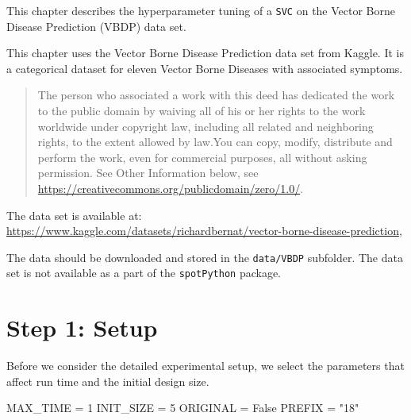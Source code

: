\documentclass[
  letterpaper,
  DIV=11,
  numbers=noendperiod]{scrreprt}
\newenvironment{Shaded}{\begin{snugshade}}{\end{snugshade}}
\newcommand{\DecValTok}[1]{\textcolor[rgb]{0.68,0.00,0.00}{#1}}
\newcommand{\NormalTok}[1]{\textcolor[rgb]{0.00,0.23,0.31}{#1}}
\newcommand{\OperatorTok}[1]{\textcolor[rgb]{0.37,0.37,0.37}{#1}}
\newcommand{\StringTok}[1]{\textcolor[rgb]{0.13,0.47,0.30}{#1}}
\newcommand{\VariableTok}[1]{\textcolor[rgb]{0.07,0.07,0.07}{#1}}
\begin{document}
This chapter describes the hyperparameter tuning of a \texttt{SVC} on
the Vector Borne Disease Prediction (VBDP) data set.

\begin{tcolorbox}[enhanced jigsaw, left=2mm, title=\textcolor{quarto-callout-important-color}{\faExclamation}\hspace{0.5em}{Vector Borne Disease Prediction Data Set}, titlerule=0mm, toprule=.15mm, leftrule=.75mm, colbacktitle=quarto-callout-important-color!10!white, colback=white, arc=.35mm, toptitle=1mm, bottomtitle=1mm, colframe=quarto-callout-important-color-frame, bottomrule=.15mm, rightrule=.15mm, breakable, coltitle=black, opacitybacktitle=0.6, opacityback=0]

This chapter uses the Vector Borne Disease Prediction data set from
Kaggle. It is a categorical dataset for eleven Vector Borne Diseases
with associated symptoms.

\begin{quote}
The person who associated a work with this deed has dedicated the work
to the public domain by waiving all of his or her rights to the work
worldwide under copyright law, including all related and neighboring
rights, to the extent allowed by law.You can copy, modify, distribute
and perform the work, even for commercial purposes, all without asking
permission. See Other Information below, see
\url{https://creativecommons.org/publicdomain/zero/1.0/}.
\end{quote}

The data set is available at:
\url{https://www.kaggle.com/datasets/richardbernat/vector-borne-disease-prediction},

The data should be downloaded and stored in the \texttt{data/VBDP}
subfolder. The data set is not available as a part of the
\texttt{spotPython} package.

\end{tcolorbox}

\hypertarget{sec-setup-18}{%
\section{Step 1: Setup}\label{sec-setup-18}}

Before we consider the detailed experimental setup, we select the
parameters that affect run time and the initial design size.

\begin{Shaded}
\begin{Highlighting}[]
\NormalTok{MAX\_TIME }\OperatorTok{=} \DecValTok{1}
\NormalTok{INIT\_SIZE }\OperatorTok{=} \DecValTok{5}
\NormalTok{ORIGINAL }\OperatorTok{=} \VariableTok{False}
\NormalTok{PREFIX }\OperatorTok{=} \StringTok{"18"}
\end{Highlighting}
\end{Shaded}
\end{document}
